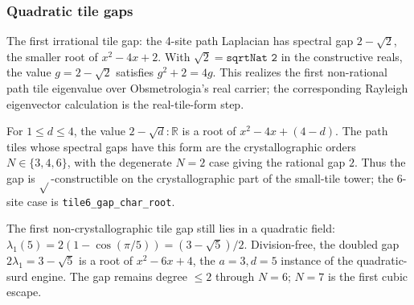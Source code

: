 \subsubsection{Quadratic tile gaps}

\begin{theorem}\label{thm:tile4-irrational-gap}\leanok{}
The first irrational tile gap: the 4-site path Laplacian has spectral gap
$2-\sqrt2$, the smaller root of $x^2-4x+2$. With
$\sqrt2=\texttt{sqrtNat 2}$ in the constructive reals, the value
$g=2-\sqrt2$ satisfies $g^2+2=4g$. This realizes the first non-rational path
tile eigenvalue over Obsmetrologia's real carrier; the corresponding Rayleigh
eigenvector calculation is the real-tile-form step.
\end{theorem}

\begin{theorem}\label{thm:tile-crystallographic-gap}\leanok{}
For $1\le d\le4$, the value $2-\sqrt d:\mathbb R$ is a root of
$x^2-4x+(4-d)$. The path tiles whose spectral gaps have this form are the
crystallographic orders $N\in\{3,4,6\}$, with the degenerate $N=2$ case giving
the rational gap $2$. Thus the gap is $\sqrt{}$-constructible on the
crystallographic part of the small-tile tower; the $6$-site case is
\texttt{tile6\_gap\_char\_root}.
\end{theorem}

\begin{theorem}\label{thm:tile5-golden-gap}\leanok{}
The first non-crystallographic tile gap still lies in a quadratic field:
$\lambda_1(5)=2(1-\cos(\pi/5))=(3-\sqrt5)/2$. Division-free, the doubled gap
$2\lambda_1=3-\sqrt5$ is a root of $x^2-6x+4$, the $a=3,d=5$ instance of the
quadratic-surd engine. The gap remains degree $\le2$ through $N=6$; $N=7$ is
the first cubic escape.
\end{theorem}
